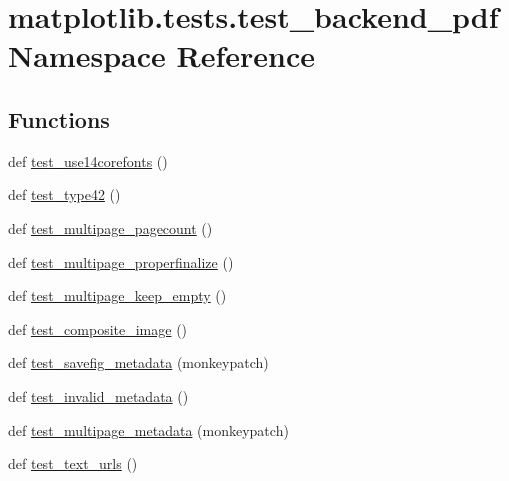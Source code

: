 \hypertarget{namespacematplotlib_1_1tests_1_1test__backend__pdf}{}\section{matplotlib.\+tests.\+test\+\_\+backend\+\_\+pdf Namespace Reference}
\label{namespacematplotlib_1_1tests_1_1test__backend__pdf}
\subsection*{Functions}
\begin{DoxyCompactItemize}
\item 
def \hyperlink{namespacematplotlib_1_1tests_1_1test__backend__pdf_abb1d89d888da26f33f4327d5549f6f41}{test\+\_\+use14corefonts} ()
\item 
def \hyperlink{namespacematplotlib_1_1tests_1_1test__backend__pdf_a6b15eae52079114dbefa19f739b98d32}{test\+\_\+type42} ()
\item 
def \hyperlink{namespacematplotlib_1_1tests_1_1test__backend__pdf_a01bb440c3152d2a268e38dd3d3e85bf9}{test\+\_\+multipage\+\_\+pagecount} ()
\item 
def \hyperlink{namespacematplotlib_1_1tests_1_1test__backend__pdf_af35bcd33a53faae5d1f6f12c8aa18654}{test\+\_\+multipage\+\_\+properfinalize} ()
\item 
def \hyperlink{namespacematplotlib_1_1tests_1_1test__backend__pdf_ae00c6832c8c0330cdca5747aec397b26}{test\+\_\+multipage\+\_\+keep\+\_\+empty} ()
\item 
def \hyperlink{namespacematplotlib_1_1tests_1_1test__backend__pdf_a02ecf9ca7c7f62a808277707d21525b3}{test\+\_\+composite\+\_\+image} ()
\item 
def \hyperlink{namespacematplotlib_1_1tests_1_1test__backend__pdf_a8644d7ef50cda0a34f4dc1af483ab861}{test\+\_\+savefig\+\_\+metadata} (monkeypatch)
\item 
def \hyperlink{namespacematplotlib_1_1tests_1_1test__backend__pdf_a31bfd153ed63188fd999fba1d6e541e5}{test\+\_\+invalid\+\_\+metadata} ()
\item 
def \hyperlink{namespacematplotlib_1_1tests_1_1test__backend__pdf_a76fd2695c1dc186bdd0d1c7785f406a5}{test\+\_\+multipage\+\_\+metadata} (monkeypatch)
\item 
def \hyperlink{namespacematplotlib_1_1tests_1_1test__backend__pdf_afd5a2c43e7c7eb17fb8e78ce1c38e1d0}{test\+\_\+text\+\_\+urls} ()
\item 

\end{DoxyCompactItemize}
